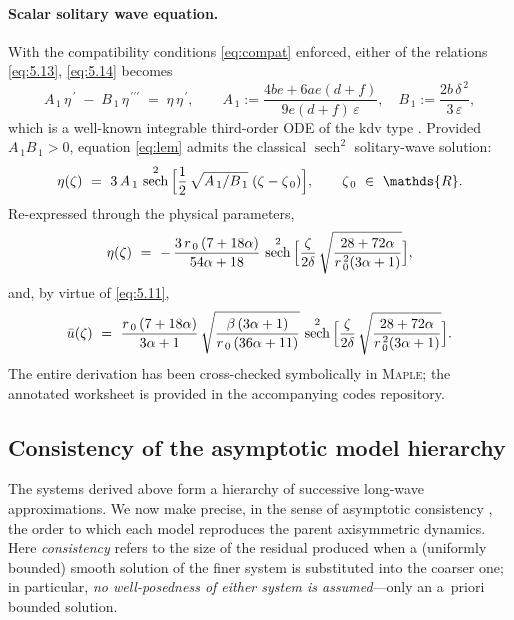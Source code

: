 \documentclass[alpha-refs, 12pt]{wiley-article}
\DeclareMathOperator{\sech}{sech}
\newcommand{\R}{\mathds{R}}
\newcommand{\eps}{\varepsilon}
\begin{document}
\paragraph{Scalar solitary wave equation.} With the compatibility conditions \eqref{eq:compat} enforced, either of the relations \eqref{eq:5.13}, \eqref{eq:5.14} becomes
\begin{equation}
  A_{\,1}\,\eta^{\,\prime}
  \;-\;
  B_{\,1}\,\eta^{\,\prime\prime\prime}
  \;=\;
  \eta\,\eta^{\,\prime},
  \qquad
  A_{\,1}:=\frac{4be+6ae(d+f)}{9e(d+f)\,\eps},
  \quad
  B_{\,1}:=\frac{2b\,\delta^{\,2}}{3\,\eps},
  \label{eq:lem}
\end{equation}
which is a well-known integrable third-order ODE of the \acrshort{kdv} type \citep{Newell1977}. Provided $A_{\,1}B_{\,1}>0$, equation \eqref{eq:lem} admits the classical $\sech^{2}$ solitary-wave solution:
\begin{equation*}
  \eta(\zeta)\ =\ 3\,A_{\,1}\,
  \sech^{2}\,\Bigl[
    \frac12\,\sqrt{A_{\,1}/B_{\,1}}\;(\zeta-\zeta_{\,0})
  \Bigr], \qquad \zeta_{\,0}\ \in\ \R.
\end{equation*}
Re-expressed through the physical parameters,
\begin{equation}
  \eta(\zeta)\ =\ -\,\frac{3\,r_{\,0}\,(7+18\alpha)}{54\alpha+18}\,
  \sech^{2}\,\Bigl[\frac{\zeta}{2\delta}\,\sqrt{\frac{28+72\alpha}{r_{\,0}^{\,2}(3\alpha+1)}}\Bigr], \label{eq:solitarybouss1}
\end{equation}
and, by virtue of \eqref{eq:5.11},
\begin{equation}
  \bar{u}(\zeta)\ =\ \frac{r_{\,0}\,(7+18\alpha)}{3\alpha+1}\,
  \sqrt{\frac{\beta\,(3\alpha+1)}{r_{\,0}\,(36\alpha+11)}}\,
  \sech^{2}\,\Bigl[\frac{\zeta}{2\delta}\,\sqrt{\frac{28+72\alpha}{r_{\,0}^{\,2}(3\alpha+1)}}\Bigr]. \label{eq:solitarybouss2}
\end{equation}
The entire derivation has been cross-checked symbolically in \textsc{Maple}; the annotated worksheet is provided in the accompanying codes repository.

\subsection{Consistency of the asymptotic model hierarchy}\label{sec:consistency}

The systems derived above form a hierarchy of successive long-wave approximations. We now make precise, in the sense of asymptotic consistency \citep{Lannes2013, BCL, Israwi2011}, the order to which each model reproduces the parent axisymmetric dynamics. Here \emph{consistency} refers to the size of the residual produced when a (uniformly bounded) smooth solution of the finer system is substituted into the coarser one; in particular, \emph{no well-posedness of either system is assumed}---only an a~priori bounded solution.
\end{document}
